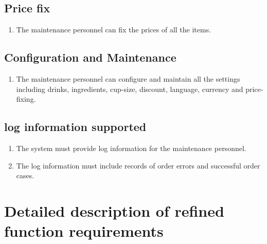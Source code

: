 \documentclass[a4paper]{report}
\begin{document}
\subsection{Price fix}
\begin{enumerate}
\item The maintenance personnel can fix the prices of all the items.
\end{enumerate}

\subsection{Configuration and Maintenance}
\begin{enumerate}
\item The maintenance personnel can configure and maintain all the settings including drinks, ingredients, cup-size, discount, language, currency and price-fixing.
\end{enumerate}

\subsection{log information supported}
\begin{enumerate}
\item The system must provide log information for the maintenance personnel.
\item The log information must include records of order errors and successful order cases.
\end{enumerate}

\section{Detailed description of refined function requirements}
\end{document}
